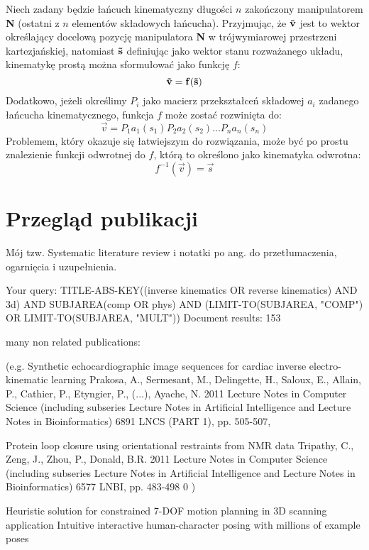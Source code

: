 \documentclass[11pt]{mwrep}
\begin{document}
 Niech zadany będzie łańcuch kinematyczny długości $n$ zakończony manipulatorem \textbf{N} (ostatni z $n$ elementów składowych łańcucha). Przyjmując, że $\bf\vec{v}$ jest to wektor określający docelową pozycję manipulatora \textbf{N} w trójwymiarowej przestrzeni kartezjańskiej, natomiast $\bf\vec{s}$ definiując jako wektor stanu rozważanego układu, kinematykę prostą można sformułować jako funkcję $f$:
$$
\bf\vec{v} = f(\bf\vec{s})
$$
Dodatkowo, jeżeli określimy $P_i$ jako macierz przekształceń składowej $a_i$ zadanego łańcucha kinematycznego, funkcja $f$ może zostać rozwinięta do:
$$
{\vec{v}} = P_1a_1({s_1})P_2a_2({s_2}) \dots P_na_n({s_n})
$$
Problemem, który okazuje się łatwiejszym do rozwiązania, może być po prostu znalezienie funkcji odwrotnej do $f$, którą to określono jako kinematyka odwrotna:
$$
f^{-1} (\vec{v})  = \vec{s}
$$
  \section{Przegląd publikacji}

Mój tzw. Systematic literature review i notatki po ang. do przetłumaczenia, ogarnięcia i uzupełnienia.


    Your query:   TITLE-ABS-KEY((inverse kinematics OR reverse kinematics) AND 3d) AND SUBJAREA(comp OR phys) AND (LIMIT-TO(SUBJAREA, "COMP") OR LIMIT-TO(SUBJAREA, "MULT")) Document results: 153 

many non related publications:

(e.g. Synthetic echocardiographic image sequences for cardiac inverse electro-kinematic learning     Prakosa, A., Sermesant, M., Delingette, H., Saloux, E., Allain, P., Cathier, P., Etyngier, P., (...), Ayache, N.     2011     Lecture Notes in Computer Science (including subseries Lecture Notes in Artificial Intelligence and Lecture Notes in Bioinformatics) 6891 LNCS (PART 1), pp. 505-507,

Protein loop closure using orientational restraints from NMR data     Tripathy, C., Zeng, J., Zhou, P., Donald, B.R.     2011     Lecture Notes in Computer Science (including subseries Lecture Notes in Artificial Intelligence and Lecture Notes in Bioinformatics) 6577 LNBI, pp. 483-498     0  )

        Heuristic solution for constrained 7-DOF motion planning in 3D scanning application
        Intuitive interactive human-character posing with millions of example poses
\end{document}
